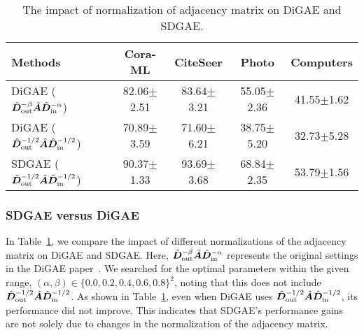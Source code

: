 \begin{table}[h]
\centering
\caption{The impact of normalization of adjacency matrix on DiGAE and SDGAE.}
\begin{tabular}{lcccc}
\toprule
Methods &Cora-ML	&CiteSeer	&Photo	&Computers  \\ \midrule
DiGAE ($\hat{{\bm{D}}}_{\rm out}^{-\beta}\hat{{\bm{A}}}\hat{{\bm{D}}}_{\rm in}^{-\alpha}$) &82.06$\pm$2.51 	&83.64$\pm$3.21	&55.05$\pm$2.36	&41.55$\pm$1.62  \\
DiGAE ($\hat{{\bm{D}}}_{\rm out}^{-1/2}\hat{{\bm{A}}}\hat{{\bm{D}}}_{\rm in}^{-1/2}$)&70.89$\pm$3.59	&71.60$\pm$6.21	&38.75$\pm$5.20	&32.73$\pm$5.28   \\
SDGAE ($\hat{{\bm{D}}}_{\rm out}^{-1/2}\hat{{\bm{A}}}\hat{{\bm{D}}}_{\rm in}^{-1/2}$) &90.37$\pm$1.33	&93.69$\pm$3.68 	&68.84$\pm$2.35 	&53.79$\pm$1.56 \\
\bottomrule
\end{tabular}
\label{app_norm}
\end{table}


\subsubsection{SDGAE versus DiGAE}\label{app_sdgae_digae}
In Table~\ref{app_norm}, we compare the impact of different normalizations of the adjacency matrix on DiGAE and SDGAE. Here, $\hat{{\bm{D}}}_{\rm out}^{-\beta}\hat{{\bm{A}}}\hat{{\bm{D}}}_{\rm in}^{-\alpha}$ represents the original settings in the DiGAE paper~\cite{digae}. We searched for the optimal parameters within the given range, $(\alpha,\beta) \in \{0.0, 0.2, 0.4, 0.6, 0.8\}^2$, noting that this does not include $\hat{{\bm{D}}}_{\rm out}^{-1/2}\hat{{\bm{A}}}\hat{{\bm{D}}}_{\rm in}^{-1/2}$. As shown in Table~\ref{app_norm}, even when DiGAE uses $\hat{{\bm{D}}}_{\rm out}^{-1/2}\hat{{\bm{A}}}\hat{{\bm{D}}}_{\rm in}^{-1/2}$, its performance did not improve. This indicates that SDGAE’s performance gains are not solely due to changes in the normalization of the adjacency matrix.


